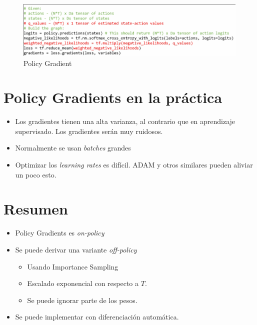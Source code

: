 \begin{figure}[H]
	\centering
	\includegraphics[width=0.8\linewidth]{figures/2020-06-13-132508_897x220_scrot.png}
	\caption{Policy Gradient}
\end{figure}

\section{Policy Gradients en la práctica}%
\label{sec:policy_gradients_en_la_práctica}

\begin{itemize}
    \item Los gradientes tienen una alta varianza, al contrario que en aprendizaje
        supervisado. Los gradientes serán muy ruidosos.
    \item Normalmente se usan \textit{batches} grandes
    \item Optimizar los \textit{learning rates} es difícil. ADAM y otros similares pueden
        aliviar un poco esto.
\end{itemize}

\section{Resumen}%
\label{sec:resumen}

\begin{itemize}
    \item Policy Gradients es \textit{on-policy}
    \item Se puede derivar una variante \textit{off-policy}
        \begin{itemize}
            \item Usando Importance Sampling
            \item Escalado exponencial con respecto a $T$.
            \item Se puede ignorar parte de los pesos.
        \end{itemize}
    \item Se puede implementar con diferenciación automática.
\end{itemize}
